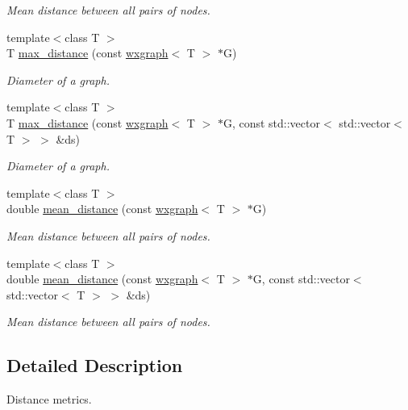 \begin{DoxyCompactItemize}
\begin{DoxyCompactList}\small\item\em Mean distance between all pairs of nodes. \end{DoxyCompactList}\item 
{\footnotesize template$<$class T $>$ }\\T \hyperlink{namespacelgraph_1_1networks_1_1metrics_1_1distance_ab497d212293a672c1b511f3e9224603d}{max\+\_\+distance} (const \hyperlink{classlgraph_1_1wxgraph}{wxgraph}$<$ T $>$ $\ast$G)
\begin{DoxyCompactList}\small\item\em Diameter of a graph. \end{DoxyCompactList}\item 
{\footnotesize template$<$class T $>$ }\\T \hyperlink{namespacelgraph_1_1networks_1_1metrics_1_1distance_ab8e7a10f4ecd1e1babf463b151027fa5}{max\+\_\+distance} (const \hyperlink{classlgraph_1_1wxgraph}{wxgraph}$<$ T $>$ $\ast$G, const std\+::vector$<$ std\+::vector$<$ T $>$ $>$ \&ds)
\begin{DoxyCompactList}\small\item\em Diameter of a graph. \end{DoxyCompactList}\item 
{\footnotesize template$<$class T $>$ }\\double \hyperlink{namespacelgraph_1_1networks_1_1metrics_1_1distance_a17eab7f8ea3692a6f531219ebd567a2f}{mean\+\_\+distance} (const \hyperlink{classlgraph_1_1wxgraph}{wxgraph}$<$ T $>$ $\ast$G)
\begin{DoxyCompactList}\small\item\em Mean distance between all pairs of nodes. \end{DoxyCompactList}\item 
{\footnotesize template$<$class T $>$ }\\double \hyperlink{namespacelgraph_1_1networks_1_1metrics_1_1distance_a9fac278edc61e5d86776b7243b6f793a}{mean\+\_\+distance} (const \hyperlink{classlgraph_1_1wxgraph}{wxgraph}$<$ T $>$ $\ast$G, const std\+::vector$<$ std\+::vector$<$ T $>$ $>$ \&ds)
\begin{DoxyCompactList}\small\item\em Mean distance between all pairs of nodes. \end{DoxyCompactList}\end{DoxyCompactItemize}


\subsection{Detailed Description}
Distance metrics. 

